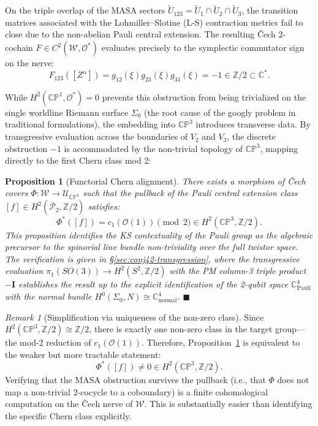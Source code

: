 \documentclass[11pt,a4paper]{article}
\newtheorem{proposition}[theorem]{Proposition}
\theoremstyle{remark}
\newtheorem{remark}[theorem]{Remark}
\newcommand{\CP}{\mathbb{CP}}
\newcommand{\C}{\mathbb{C}}
\newcommand{\Z}{\mathbb{Z}}
\newcommand{\cO}{\mathcal{O}}
\newcommand{\barPP}{\overline{\mathcal{P}}}
\begin{document}
On the triple overlap of the MASA sectors
$\tilde{U}_{123} = \tilde{U}_1 \cap \tilde{U}_2 \cap \tilde{U}_3$,
the transition matrices associated with the Lohmiller--Slotine (L-S)
contraction metrics fail to close due to the non-abelian Pauli
central extension. The resulting \v{C}ech 2-cochain
$F \in C^2(\mathcal{W}, \cO^*)$ evaluates precisely to the
symplectic commutator sign on the nerve:
\begin{equation}
  F_{123}([Z^\alpha]) = g_{12}(\xi) g_{23}(\xi) g_{31}(\xi)
    = -1 \in \Z/2 \subset \C^*.
\end{equation}

While $H^2(\CP^1, \cO^*) = 0$ prevents this obstruction from being
trivialized on the single worldline Riemann surface $\Sigma_0$
(the root cause of the googly problem in traditional formulations),
the embedding into $\CP^3$ introduces transverse data. By
transgressive evaluation across the boundaries of $V_2$ and $V_3$,
the discrete obstruction $-1$ is accommodated by the non-trivial
topology of $\CP^3$, mapping directly to the first Chern class
mod 2:
\begin{proposition}[Functorial Chern alignment]
\label{conjecture:global_embedding}
There exists a morphism of \v{C}ech covers
$\Phi: \mathcal{W} \to \mathcal{U}_{\CP^3}$ such that the
pullback of the Pauli central extension class
$[f] \in H^2(\barPP_2, \Z/2)$ satisfies:
\begin{equation}
\Phi^*([f]) = c_1(\cO(1)) \pmod 2 \in H^2(\CP^3, \Z/2).
\end{equation}
This proposition identifies the KS contextuality of the Pauli group
as the algebraic precursor to the spinorial line bundle
non-triviality over the full twistor space.
The verification is given in \S\ref{sec:conj42-transgression},
where the transgressive evaluation $\pi_1(SO(3)) \to H^2(S^2, \Z/2)$
with the PM column-3 triple product $-\mathbf{I}$ establishes the
result up to the explicit identification of the 2-qubit space
$\C^4_{\text{Pauli}}$ with the normal bundle
$H^0(\Sigma_0, N) \cong \C^4_{\text{normal}}$.
$\blacksquare$
\end{proposition}

\begin{remark}[Simplification via uniqueness of the non-zero class]
Since $H^2(\CP^3, \Z/2) \cong \Z/2$, there is exactly one non-zero
class in the target group---the mod-2 reduction of
$c_1(\cO(1))$. Therefore, Proposition~\ref{conjecture:global_embedding}
is equivalent to the weaker but more tractable statement:
\[
\Phi^*([f]) \neq 0 \in H^2(\CP^3, \Z/2).
\]
Verifying that the MASA obstruction survives the pullback (i.e.,
that $\Phi$ does not map a non-trivial 2-cocycle to a coboundary)
is a finite cohomological computation on the \v{C}ech nerve of
$\mathcal{W}$. This is substantially easier than identifying
the specific Chern class explicitly.
\end{remark}
\end{document}
